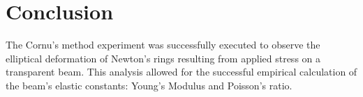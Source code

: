 \documentclass[../main.tex]{subfiles}
\begin{document}
\section{Conclusion}
The Cornu's method experiment was successfully executed to observe the elliptical deformation of Newton's rings resulting from applied stress on a transparent beam. This analysis allowed for the successful empirical calculation of the beam's elastic constants: Young's Modulus and Poisson's ratio.
\end{document}
